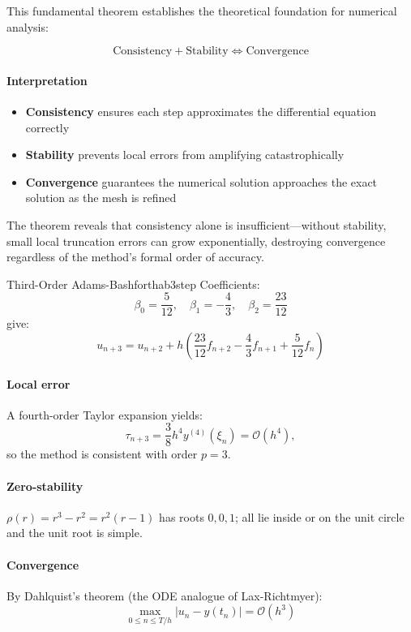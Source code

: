 This fundamental theorem establishes the theoretical foundation for numerical analysis:

\[
    \boxed{\text{Consistency} + \text{Stability} \iff \text{Convergence}}
\]

\paragraph{Interpretation}
\begin{itemize}
    \item \textbf{Consistency} ensures each step approximates the differential equation correctly
    \item \textbf{Stability} prevents local errors from amplifying catastrophically
    \item \textbf{Convergence} guarantees the numerical solution approaches the exact solution as the mesh is refined
\end{itemize}

The theorem reveals that consistency alone is insufficient—without stability, small local truncation errors can grow exponentially, destroying convergence regardless of the method's formal order of accuracy.

\begin{example}{Third-Order Adams-Bashforth}{ab3step}
    Coefficients:
    \[
        \beta_0=\frac{5}{12},\quad
        \beta_1=-\frac{4}{3},\quad
        \beta_2=\frac{23}{12}
    \]
    give:
    \[
        u_{n+3}=u_{n+2}
        +h\left(\frac{23}{12}f_{n+2}-\frac{4}{3}f_{n+1}+\frac{5}{12}f_{n}\right)
    \]

    \paragraph{Local error}
    A fourth-order Taylor expansion yields:
    \[
        \tau_{n+3} = \frac{3}{8}h^{4}y^{(4)}(\xi_n) = \mathcal{O}(h^{4}),
    \]
    so the method is consistent with order $p=3$.
    \paragraph{Zero-stability}
    $\rho(r)=r^3-r^2=r^2(r-1)$ has roots $0,0,1$; all lie inside or on the unit circle and the unit root is simple.

    \paragraph{Convergence}
    By Dahlquist's theorem (the ODE analogue of Lax-Richtmyer):
    \[
        \max_{0\le n\le T/h}|u_n-y(t_n)|=\mathcal{O}(h^{3})
    \]
\end{example}


